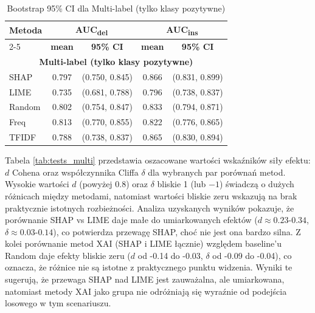 \documentclass[wmii, inf, mgr]{uwmthesis}
\begin{document}
\begin{table}[H]
	\centering
	\renewcommand{\arraystretch}{1.3}
	\begin{tabular}{|l|c|c|c|c|}
		\hline
		\textbf{Metoda} & \multicolumn{2}{c|}{\textbf{AUC\textsubscript{del}}} & \multicolumn{2}{c|}{\textbf{AUC\textsubscript{ins}}} \\ \cline{2-5}
		& \textbf{mean} & \textbf{95\% CI} & \textbf{mean} & \textbf{95\% CI} \\ \hline
		\multicolumn{5}{|c|}{\textbf{Multi-label (tylko klasy pozytywne)}} \\ \hline
		SHAP   & 0.797 & (0.750, 0.845) & 0.866 & (0.831, 0.899) \\ \hline
		LIME   & 0.735 & (0.681, 0.788) & 0.796 & (0.738, 0.837) \\ \hline
		Random & 0.802 & (0.754, 0.847) & 0.833 & (0.794, 0.871) \\ \hline
		Freq   & 0.813 & (0.770, 0.855) & 0.822 & (0.776, 0.865) \\ \hline
		TFIDF  & 0.788 & (0.738, 0.837) & 0.865 & (0.830, 0.894) \\ \hline
	\end{tabular}
	\caption{Bootstrap 95\% CI dla Multi-label (tylko klasy pozytywne)}
	\label{tab:ci_multi}
\end{table}


Tabela \ref{tab:tests_multi} przedstawia oszacowane wartości wskaźników siły efektu: $d$ Cohena oraz współczynnika Cliffa $\delta$ dla wybranych par porównań metod. Wysokie wartości $d$ (powyżej 0.8) oraz $\delta$ bliskie 1 (lub $-1$) świadczą o dużych różnicach między metodami, natomiast wartości bliskie zeru wskazują na brak praktycznie istotnych rozbieżności. Analiza uzyskanych wyników pokazuje, że porównanie SHAP vs LIME daje małe do umiarkowanych efektów ($d \approx 0.23$-$0.34$, $\delta \approx 0.03$-$0.14$), co potwierdza przewagę SHAP, choć nie jest ona bardzo silna. Z kolei porównanie metod XAI (SHAP i LIME łącznie) względem baseline’u Random daje efekty bliskie zeru ($d$ od -0.14 do -0.03, $\delta$ od -0.09 do -0.04), co oznacza, że różnice nie są istotne z praktycznego punktu widzenia. Wyniki te sugerują, że przewaga SHAP nad LIME jest zauważalna, ale umiarkowana, natomiast metody XAI jako grupa nie odróżniają się wyraźnie od podejścia losowego w tym scenariuszu.
\end{document}
